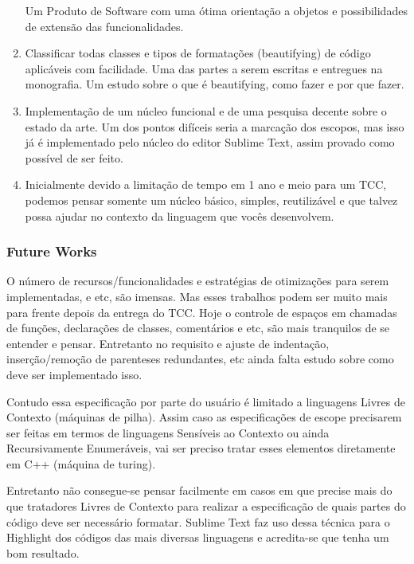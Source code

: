 \begin{englishtext}
\begin{enumerate}[leftmargin=*]
        Um Produto de Software com uma ótima orientação a objetos e possibilidades de extensão das
        funcionalidades.

        \item

        Classificar todas classes e tipos de formatações (beautifying) de código aplicáveis com
        facilidade. Uma das partes a serem escritas e entregues na monografia. Um estudo sobre o que
        é beautifying, como fazer e por que fazer.

        \item

        Implementação de um núcleo funcional e de uma pesquisa decente sobre o estado da arte. Um
        dos pontos difíceis seria a marcação dos escopos, mas isso já é implementado pelo núcleo do
        editor Sublime Text, assim provado como possível de ser feito.

        \item

        Inicialmente devido a limitação de tempo em 1 ano e meio para um TCC, podemos pensar somente
        um núcleo básico, simples, reutilizável e que talvez possa ajudar no contexto da linguagem
        que vocês desenvolvem.

    \end{enumerate}


\subsubsection{Future Works}

    O número de recursos/funcionalidades e estratégias de otimizações para serem implementadas, e
    etc, são imensas. Mas esses trabalhos podem ser muito mais para frente depois da entrega do TCC.
    Hoje o controle de espaços em chamadas de funções, declarações de classes, comentários e etc,
    são mais tranquilos de se entender e pensar. Entretanto no requisito e ajuste de indentação,
    inserção/remoção de parenteses redundantes, etc ainda falta estudo sobre como deve ser
    implementado isso.

    Contudo essa especificação por parte do usuário é limitado a linguagens Livres de Contexto
    (máquinas de pilha). Assim caso as especificações de escope precisarem ser feitas em termos de
    linguagens Sensíveis ao Contexto ou ainda Recursivamente Enumeráveis, vai ser preciso tratar
    esses elementos diretamente em C++ (máquina de turing).

    Entretanto não consegue-se pensar facilmente em casos em que precise mais do que tratadores
    Livres de Contexto para realizar a especificação de quais partes do código deve ser necessário
    formatar. Sublime Text faz uso dessa técnica para o Highlight dos códigos das mais diversas
    linguagens e acredita-se que tenha um bom resultado.



\end{englishtext}
